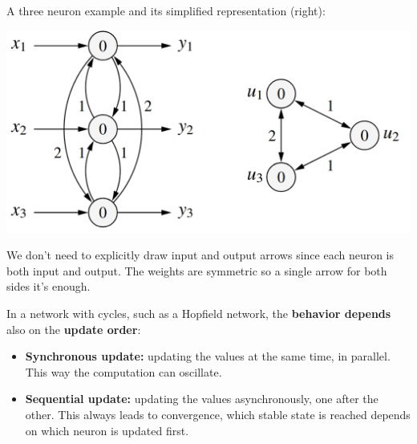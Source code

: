 \documentclass[11pt]{article}
\begin{document}
		A three neuron example and its simplified representation (right):
		\begin{center}
			\includegraphics[width=0.8\columnwidth]{img/NN/HN2}
		\end{center}
		We don't need to explicitly draw input and output arrows since each neuron is both input and output. The weights are symmetric so a single arrow for both sides it's enough.\\
		
		\newpage
		
		In a network with cycles, such as a Hopfield network, the \textbf{behavior depends} also on the \textbf{update order}:
		\begin{itemize}
			\item \textbf{Synchronous update:} updating the values at the same time, in parallel. This way the computation can oscillate.\\
			
			\item \textbf{Sequential update:} updating the values asynchronously, one after the other. This always leads to convergence, which stable state is reached depends on which neuron is updated first.\\
		\end{itemize}
		
\end{document}
